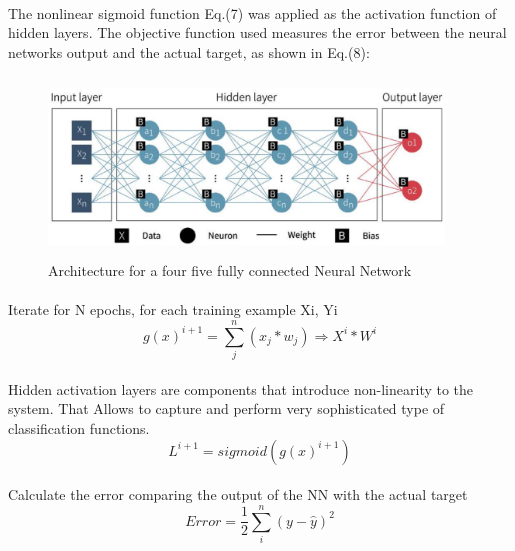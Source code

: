 \documentclass{llncs}       %
\begin{document}
\paragraph{}
The nonlinear sigmoid function Eq.(7) was applied as the activation function of hidden layers. The objective function used measures the error between the neural networks output and the actual target, as shown in Eq.(8): 

\begin{figure}[h]
\centering
\includegraphics[width=10.51cm,height=4.77cm]{media/deep-nn1.eps}
\caption{Architecture for a four five fully connected 
Neural Network}
\end{figure}


\paragraph{}Iterate for N epochs,  for each training example Xi, Yi 
\begin{equation} 
g(x)^{i+1}=\sum_j^n(x_{j}*w_{j})\Rightarrow X^{i}*W^{i}
\end{equation}

\paragraph{}
Hidden activation layers are components that introduce non-linearity to 
the system. That Allows to capture and perform very sophisticated type 
of classification functions.
\begin{equation} 
L^{i+1}=sigmoid(g(x)^{i+1})
\end{equation}

\paragraph{}
\paragraph{}Calculate the error comparing the output of the NN with the actual target 
\begin{equation} 
Error = \frac{1}{2}\sum_i^n( y -\widehat{y})^2
\end{equation}
\end{document}
